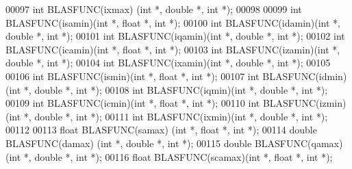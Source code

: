 \begin{DoxyCode}
00097 \textcolor{keywordtype}{int}    BLASFUNC(ixmax) (\textcolor{keywordtype}{int} *, \textcolor{keywordtype}{double} *, \textcolor{keywordtype}{int} *);
00098 
00099 \textcolor{keywordtype}{int}    BLASFUNC(isamin)(\textcolor{keywordtype}{int} *, \textcolor{keywordtype}{float}  *, \textcolor{keywordtype}{int} *);
00100 \textcolor{keywordtype}{int}    BLASFUNC(idamin)(\textcolor{keywordtype}{int} *, \textcolor{keywordtype}{double} *, \textcolor{keywordtype}{int} *);
00101 \textcolor{keywordtype}{int}    BLASFUNC(iqamin)(\textcolor{keywordtype}{int} *, \textcolor{keywordtype}{double} *, \textcolor{keywordtype}{int} *);
00102 \textcolor{keywordtype}{int}    BLASFUNC(icamin)(\textcolor{keywordtype}{int} *, \textcolor{keywordtype}{float}  *, \textcolor{keywordtype}{int} *);
00103 \textcolor{keywordtype}{int}    BLASFUNC(izamin)(\textcolor{keywordtype}{int} *, \textcolor{keywordtype}{double} *, \textcolor{keywordtype}{int} *);
00104 \textcolor{keywordtype}{int}    BLASFUNC(ixamin)(\textcolor{keywordtype}{int} *, \textcolor{keywordtype}{double} *, \textcolor{keywordtype}{int} *);
00105 
00106 \textcolor{keywordtype}{int}    BLASFUNC(ismin)(\textcolor{keywordtype}{int} *, \textcolor{keywordtype}{float}  *, \textcolor{keywordtype}{int} *);
00107 \textcolor{keywordtype}{int}    BLASFUNC(idmin)(\textcolor{keywordtype}{int} *, \textcolor{keywordtype}{double} *, \textcolor{keywordtype}{int} *);
00108 \textcolor{keywordtype}{int}    BLASFUNC(iqmin)(\textcolor{keywordtype}{int} *, \textcolor{keywordtype}{double} *, \textcolor{keywordtype}{int} *);
00109 \textcolor{keywordtype}{int}    BLASFUNC(icmin)(\textcolor{keywordtype}{int} *, \textcolor{keywordtype}{float}  *, \textcolor{keywordtype}{int} *);
00110 \textcolor{keywordtype}{int}    BLASFUNC(izmin)(\textcolor{keywordtype}{int} *, \textcolor{keywordtype}{double} *, \textcolor{keywordtype}{int} *);
00111 \textcolor{keywordtype}{int}    BLASFUNC(ixmin)(\textcolor{keywordtype}{int} *, \textcolor{keywordtype}{double} *, \textcolor{keywordtype}{int} *);
00112 
00113 \textcolor{keywordtype}{float}  BLASFUNC(samax) (\textcolor{keywordtype}{int} *, \textcolor{keywordtype}{float}  *, \textcolor{keywordtype}{int} *);
00114 \textcolor{keywordtype}{double} BLASFUNC(damax) (\textcolor{keywordtype}{int} *, \textcolor{keywordtype}{double} *, \textcolor{keywordtype}{int} *);
00115 \textcolor{keywordtype}{double} BLASFUNC(qamax) (\textcolor{keywordtype}{int} *, \textcolor{keywordtype}{double} *, \textcolor{keywordtype}{int} *);
00116 \textcolor{keywordtype}{float}  BLASFUNC(scamax)(\textcolor{keywordtype}{int} *, \textcolor{keywordtype}{float}  *, \textcolor{keywordtype}{int} *);

\end{DoxyCode}
